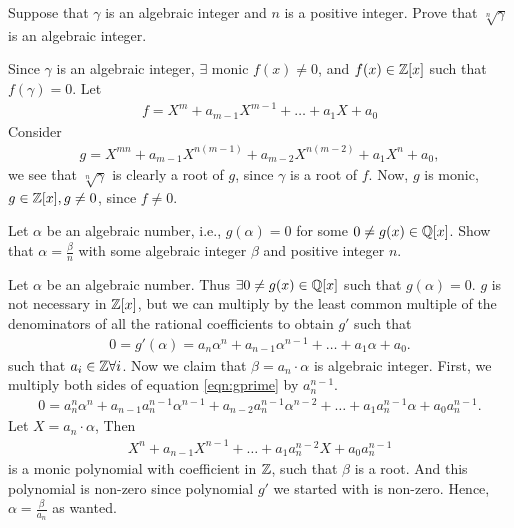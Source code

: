 \documentclass{article}
\begin{document}
\maketitle

\pagebreak

\begin{homeworkProblem}
    Suppose that $\gamma$ is an algebraic integer and $n$ is a positive integer. Prove that $\sqrt[n]{\gamma}$ is an algebraic integer.
\solution

Since $\gamma$ is an algebraic integer, $\exists$ monic $f(x) \neq 0$, and $f(x) \in \mathbb{Z}[x]$ such that $f(\gamma)=0$. 
Let \begin{align}
    f = X^m + a_{m-1} X^{m-1} + \ldots + a_1 X + a_0 
\end{align}
Consider \begin{align}
    g = X^{mn} + a_{m-1} X^{n(m-1)} + a_{m-2}X^{n(m-2)} + a_1 X^n + a_0,
\end{align}
we see that $\sqrt[n]{\gamma}$ is clearly a root of $g$, since $\gamma$ is a root of $f$. Now, $g$ is monic, $g \in \mathbb{Z}[x], g \neq 0$, since $f \neq 0$.

    

\end{homeworkProblem}

\pagebreak

\begin{homeworkProblem}
Let $\alpha$ be an algebraic number, i.e., $g(\alpha) = 0$ for some $0 \neq g(x) \in \mathbb{Q}[x]$.
Show that $\alpha = \frac{ \beta }{ n }$ with some algebraic integer $\beta$ and positive integer $n$.

\solution

Let $\alpha$ be an algebraic number. 
Thus $\exists 0 \neq g(x) \in \mathbb{Q} [x]$ such that $g(\alpha) = 0$. $g$ is not necessary in $\mathbb{Z}[x]$, 
but we can multiply by the least common multiple of the denominators of all the rational coefficients to obtain $g'$ such that
\begin{align}
    \label{eqn:gprime}
    0 = g'(\alpha) = a_n \alpha^n + a_{n-1} \alpha^{n-1} + \ldots + a_1 \alpha + a_0.
\end{align}
such that $a_i \in \mathbb{Z} \forall i$. Now we claim that $\beta = a_n \cdot \alpha$ is algebraic integer.
First, we multiply both sides of equation \ref{eqn:gprime} by $a_{n}^{n-1}$. 
\begin{align}
    0 = a_n^n \alpha^n + a_{n-1} a_n^{n-1}\alpha^{n-1} + a_{n-2} a_n^{n-1} \alpha^{n-2} + \ldots + a_1 a_n^{n-1} \alpha + a_0 a_n^{n-1}.
\end{align}
Let $X = a_n \cdot \alpha$, Then 
\begin{align}
    X^n + a_{n-1} X^{n-1} + \ldots + a_1 a_n^{n-2} X + a_0 a_n^{n-1} 
\end{align}
is a monic polynomial with coefficient in $\mathbb{Z}$,
such that $\beta$ is a root. And this polynomial is non-zero since polynomial $g'$ we started with is non-zero.
Hence, $\alpha = \frac{ \beta }{ a_n }$ as wanted. 
    


\end{homeworkProblem}
\end{document}
